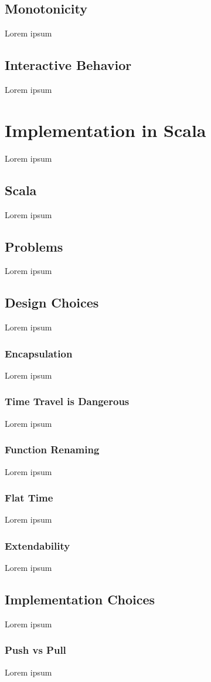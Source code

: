 \documentclass{article}
\begin{document}
    \subsection{Monotonicity}
    Lorem ipsum
    \subsection{Interactive Behavior}
    Lorem ipsum
  \section{Implementation in Scala}
    Lorem ipsum
    \subsection{Scala}
    Lorem ipsum
    \subsection{Problems}
    Lorem ipsum
    \subsection{Design Choices}
    Lorem ipsum
      \subsubsection{Encapsulation}
      Lorem ipsum
      \subsubsection{Time Travel is Dangerous}
      Lorem ipsum
      \subsubsection{Function Renaming}
      Lorem ipsum
      \subsubsection{Flat Time}
      Lorem ipsum
      \subsubsection{Extendability}
      Lorem ipsum
    \subsection{Implementation Choices}
      Lorem ipsum
      \subsubsection{Push vs Pull}
      Lorem ipsum
\end{document}
